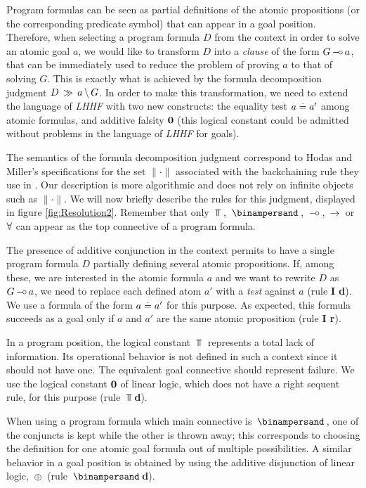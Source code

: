 Program formulas can be seen as partial definitions of the atomic
propositions (or the corresponding predicate symbol) that can appear in a
goal position. Therefore, when selecting a program formula $D$ from the
context in order to solve an atomic goal $a$, we would like to transform $D$
into a {\em clause\/} of the form $G \, \mbox{$-\!\circ$} \, a$, that can be immediately used
to reduce the problem of proving $a$ to that of solving $G$. This is exactly
what is achieved by the formula decomposition judgment $D \, \gg \, a \, \backslash \, G$. In
order to make this transformation, we need to extend the language of {\em
  LHHF\/} with two new constructs: the equality test $a \stackrel{.}{=} a'$ among
atomic formulas, and additive falsity ${\bf 0}$ (this logical constant could be
admitted without problems in the language of {\em LHHF\/} for goals).

The semantics of the formula decomposition judgment correspond to Hodas and
Miller's specifications for the set $\|\cdot\|$ associated with the
backchaining rule they use in \cite{HoM94}. Our description is more
algorithmic and does not rely on infinite objects such as $\|\cdot\|$.  We
will now briefly describe the rules for this judgment, displayed in figure
\ref{fig:Resolution2}.  Remember that only $\Top$, $\With$, $\, \mbox{$-\!\circ$} \,$, $\, \rightarrow \,$
or $\forall$ can appear as the top connective of a program formula.

The presence of additive conjunction in the context permits to have a single
program formula $D$ partially defining several atomic propositions. If, among
these, we are interested in the atomic formula $a$ and we want to rewrite $D$
as $G \, \mbox{$-\!\circ$} \, a$, we need to replace each defined atom $a'$ with a {\em
  test\/} against $a$ (rule {\bf I d}). We use a formula of the form
$a \stackrel{.}{=} a'$ for this purpose.  As expected, this formula succeeds as a goal
only if $a$ and $a'$ are the same atomic proposition (rule {\bf I r}).
  
In a program position, the logical constant $\Top$ represents a total lack of
information. Its operational behavior is not defined in such a context since
it should not have one. The equivalent goal connective should represent
failure. We use the logical constant ${\bf 0}$ of linear logic, which does not
have a right sequent rule, for this purpose (rule {\bf $\Top$d}).
  
When using a program formula which main connective is $\With$, one of the
conjuncts is kept while the other is thrown away; this corresponds to
choosing the definition for one atomic goal formula out of multiple
possibilities. A similar behavior in a goal position is obtained by using the
additive disjunction of linear logic, $\, \oplus \,$ (rule {\bf $\With$d}).
  
